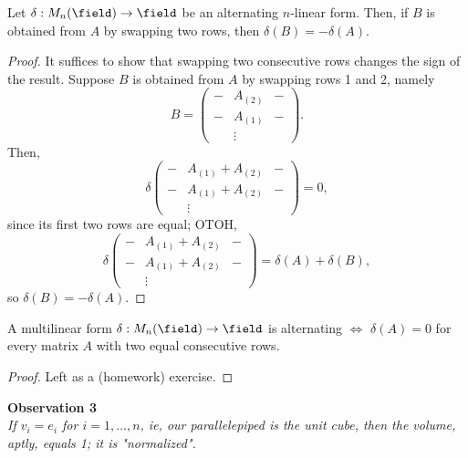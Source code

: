 \begin{proposition}\label{prop:deltaalternatingswapping}
    Let $\delta : M_n(\field) \to \field$ be an alternating $n$-linear form. Then, if $B$ is obtained from $A$ by swapping two rows, then $\delta(B) = - \delta(A)$.
\end{proposition}

\begin{proof}
    It suffices to show that swapping two consecutive rows changes the sign of the result. Suppose $B$ is obtained from $A$ by swapping rows 1 and 2, namely
    \[
    B = \begin{pmatrix}
        - & A_{(2)} & - \\
        - & A_{(1)} & - \\
        & \vdots & 
    \end{pmatrix}.  
    \]
    Then, \[
    \delta \begin{pmatrix}
        - & A_{(1)} + A_{(2)} & -\\
        - & A_{(1)}+ A_{(2)} & -\\
        & \vdots & 
    \end{pmatrix}   = 0,  
    \]
    since its first two rows are equal; OTOH,
    \[
        \delta \begin{pmatrix}
            - & A_{(1)} + A_{(2)} & -\\
            - & A_{(1)}+ A_{(2)} & -\\
            & \vdots & 
        \end{pmatrix}   = \delta(A) + \delta(B),    
    \]
    so $\delta(B) = - \delta(A)$.
\end{proof}

\begin{proposition}
    A multilinear form $\delta : M_n(\field) \to \field$ is alternating $\iff$ $\delta(A) = 0$ for every matrix $A$ with two equal consecutive rows.
\end{proposition}

\begin{proof}
    Left as a (homework) exercise.
\end{proof}



\begin{center}
    \textbf{Observation 3}\\
    \textit{If $v_i = e_i$ for $i = 1, \dots, n$, ie, our parallelepiped is the unit cube, then the volume, aptly, equals 1; it is "normalized".}
\end{center}
